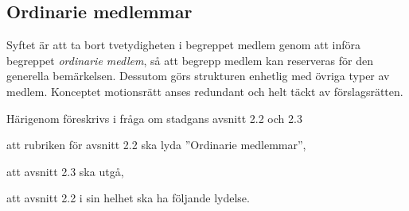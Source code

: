 \documentclass{article}
\begin{document}
\subsection{Ordinarie medlemmar}
Syftet är att ta bort tvetydigheten i begreppet medlem genom att införa begreppet \emph{ordinarie medlem}, så att begrepp medlem kan reserveras för den generella bemärkelsen.
Dessutom görs strukturen enhetlig med övriga typer av medlem.
Konceptet motionsrätt anses redundant och helt täckt av förslagsrätten.

Härigenom föreskrivs i fråga om stadgans avsnitt 2.2 och 2.3
\begin{dels}
    \item att rubriken för avsnitt 2.2 ska lyda ''Ordinarie medlemmar'',
    \item att avsnitt 2.3 ska utgå,
    \item att avsnitt 2.2 i sin helhet ska ha följande lydelse.
\end{dels}
\end{document}
